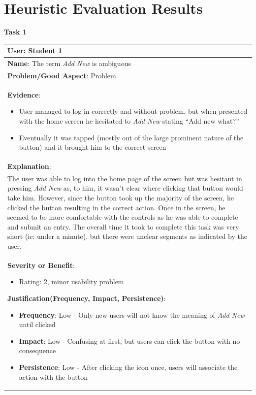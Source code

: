 \documentclass[pdftex,12pt,a4paper]{report}
\begin{document}
\section*{Heuristic Evaluation Results}
\textbf{Task 1}
\begin{center}
	\begin{tabular}{|p{\textwidth}|}
	\hline
	\textbf{User}: Student 1\\
	\hline
	\textbf{Name}: The term \emph{Add New} is ambiguous\\
	\hline
	\textbf{Problem/Good Aspect}: Problem\\
	\hline
	\textbf{Evidence}:
	\begin{itemize}
	\item{User managed to log in correctly and without problem, but when presented with the home screen he hesitated to \emph{Add New} stating ``Add new what?''}
	\item{Eventually it was tapped (mostly out of the large prominent nature of the button) and it brought him to the correct screen}
	\end{itemize}\\
	\hline
	\textbf{Explanation}:\\
	The user was able to log into the home page of the screen but was hesitant in pressing \emph{Add New} as, to him, it wasn't clear where clicking that button would take him. However, since the button took up the majority of the screen, he clicked the button resulting in the correct action. Once in the screen, he seemed to be more comfortable with the controls as he was able to complete and submit an entry. The overall time it took to complete this task was very short (ie: under a minute), but there were unclear segments as indicated by the user.\\
	\hline
	\textbf{Severity or Benefit}:
	\begin{itemize}
	\item{Rating: 2, minor usability problem}
	\end{itemize}
	\textbf{Justification(Frequency, Impact, Persistence)}:
	\begin{itemize}
	\item{\textbf{Frequency}:} Low - Only new users will not know the meaning of \emph{Add New} until clicked
	\item{\textbf{Impact}:} Low - Confusing at first, but users can click the button with no consequence
	\item{\textbf{Persistence}:} Low - After clicking the icon once, users will associate the action with the button

\end{itemize}
\end{tabular}
\end{center}
\end{document}
